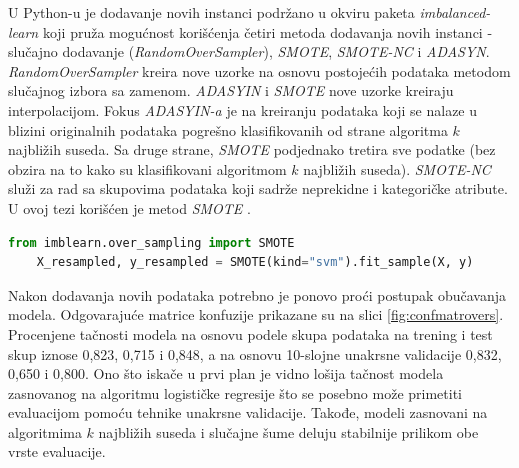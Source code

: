 \documentclass[12pt,oneside]{memoir}
\begin{document}

U Python-u je dodavanje novih instanci podržano u okviru paketa \textit{imbalanced-learn} koji pruža mogućnost korišćenja četiri metoda dodavanja novih instanci - slučajno dodavanje (\textit{RandomOverSampler}), \textit{SMOTE}, \textit{SMOTE-NC} i \textit{ADASYN}. \textit{RandomOverSampler} kreira nove uzorke na osnovu postojećih podataka metodom slučajnog izbora sa zamenom. \textit{ADASYIN} i \textit{SMOTE} nove uzorke kreiraju interpolacijom. Fokus \textit{ADASYIN-a} je na kreiranju podataka koji se nalaze u blizini originalnih podataka pogrešno klasifikovanih od strane algoritma $k$ najbližih suseda. Sa druge strane, \textit{SMOTE} podjednako tretira sve podatke (bez obzira na to kako su klasifikovani algoritmom $k$ najbližih suseda). \textit{SMOTE-NC} služi za rad sa skupovima podataka koji sadrže neprekidne i kategoričke atribute. U ovoj tezi korišćen je metod \textit{SMOTE} \cite{imblearn}.

\begin{lstlisting}[language=Python, basicstyle=\tiny]
	from imblearn.over_sampling import SMOTE
	X_resampled, y_resampled = SMOTE(kind="svm").fit_sample(X, y)
\end{lstlisting}

Nakon dodavanja novih podataka potrebno je ponovo proći postupak obučavanja modela. Odgovarajuće matrice konfuzije prikazane su na slici \ref{fig:confmatrovers}. Procenjene tačnosti modela na osnovu podele skupa podataka na trening i test skup iznose 0,823, 0,715 i 0,848, a na osnovu 10-slojne unakrsne validacije 0,832, 0,650 i 0,800. Ono što iskače u prvi plan je vidno lošija tačnost modela zasnovanog na algoritmu logističke regresije što se posebno može primetiti evaluacijom pomoću tehnike unakrsne validacije. Takođe, modeli zasnovani na algoritmima $k$ najbližih suseda i slučajne šume deluju stabilnije prilikom obe vrste evaluacije. 
\end{document}
